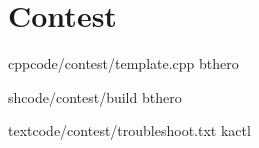 \chapter{Contest}

{}{}
{cpp}{code/contest/template.cpp}
{bthero}

{}{}
{sh}{code/contest/build}
{bthero}

{}{}
{text}{code/contest/troubleshoot.txt}
{kactl}
